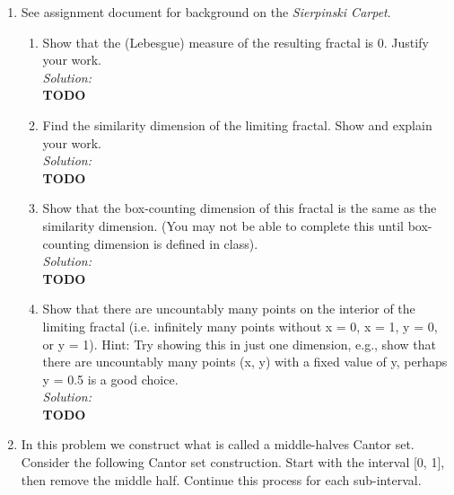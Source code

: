 \documentclass[10pt]{amsart}
\theoremstyle{nonumberplain}
\begin{document}
\begin{enumerate}[label={\bf {\arabic*}:}]
\item See assignment document for background on the \textit{Sierpinski Carpet}.
\begin{enumerate}

\item Show that the (Lebesgue) measure of the resulting fractal is 0.
Justify your work. \\

\textit{Solution:} \\
\textbf{TODO} \\

\item Find the similarity dimension of the limiting fractal. Show and explain your work. \\

\textit{Solution:} \\
\textbf{TODO} \\

\item Show that the box-counting dimension of this fractal is the same as the similarity dimension. (You may not be able to complete this until box-counting dimension is defined in class). \\

\textit{Solution:} \\
\textbf{TODO} \\

\item Show that there are uncountably many points on the interior of the limiting fractal (i.e. infinitely many points without x = 0, x = 1, y = 0, or y = 1).
Hint: Try showing this in just one dimension, e.g., show that there are uncountably many points (x, y) with a fixed value of y, perhaps y = 0.5 is a good choice. \\

\textit{Solution:} \\
\textbf{TODO} \\

\newpage

\end{enumerate}

\item In this problem we construct what is called a middle-halves Cantor set.
Consider the following Cantor set construction. Start with the interval [0, 1], then remove the middle half. Continue this process for each sub-interval. \\
\begin{enumerate}


\end{enumerate}
\end{enumerate}
\end{document}
